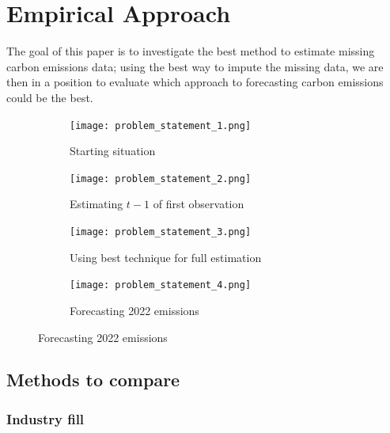 \documentclass[12pt,twoside]{report}
\begin{document}
\chapter{Empirical Approach}

The goal of this paper is to investigate the best method to estimate missing carbon emissions data; using the best way to impute the missing data, we are then in a position to evaluate which approach to forecasting carbon emissions could be the best.

\begin{figure}[H]\label{fig:ModellingApproach}
\centering
\caption{Stylised representation of modelling strategy}

\begin{subfigure}[t]{0.475\textwidth}
    \centering
    \texttt{[image: problem\_statement\_1.png]}
    \caption{Starting situation}
    \label{fig:ModellingApproach1}
\end{subfigure}
\hfill
\begin{subfigure}[t]{0.475\textwidth}
    \centering
    \texttt{[image: problem\_statement\_2.png]}
    \caption{Estimating $t-1$ of first observation}
    \label{fig:ModellingApproach2}
\end{subfigure}

\vspace{0.5cm}

\begin{subfigure}[t]{0.475\textwidth}
    \centering
    \texttt{[image: problem\_statement\_3.png]}
    \caption{Using best technique for full estimation}
    \label{fig:ModellingApproach3}
\end{subfigure}
\hfill
\begin{subfigure}[t]{0.475\textwidth}
    \centering
    \texttt{[image: problem\_statement\_4.png]}
    \caption{Forecasting 2022 emissions}
    \label{fig:ModellingApproach4}
\end{subfigure}

\end{figure}


\section{Methods to compare}

\subsection{Industry fill}
\end{document}
